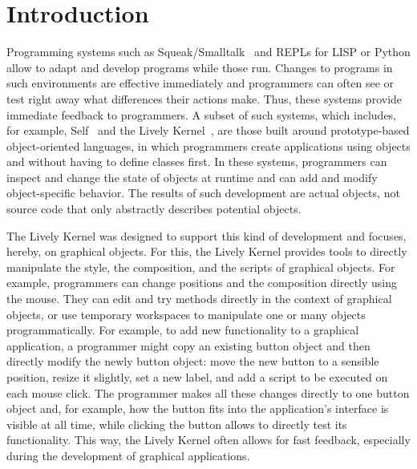 
\chapter{Introduction} \label{chapter:INTRODUCTION}

Programming systems such as Squeak/Smalltalk~\cite{GoldbergRobson83} and REPLs for LISP or Python allow to adapt and develop programs while those run.
Changes to programs in such environments are effective immediately and programmers can often see or test right away what differences their actions make.
Thus, these systems provide immediate feedback to programmers.
A subset of such systems, which includes, for example, Self~\cite{Ungar1987SPS,Ungar2007SEL} and the Lively Kernel~\cite{Ingalls2008LKS,Krahn2009LWD}, are those built around prototype-based object-oriented languages, in which programmers create applications using objects and without having to define classes first.
In these systems, programmers can inspect and change the state of objects at runtime and can add and modify object-specific behavior.
The results of such development are actual objects, not source code that only abstractly describes potential objects.

The Lively Kernel was designed to support this kind of development and focuses, hereby, on graphical objects.
For this, the Lively Kernel provides tools to directly manipulate the style, the composition, and the scripts of graphical objects.
For example, programmers can change positions and the composition directly using the mouse.
They can edit and try methods directly in the context of graphical objects, or use temporary workspaces to manipulate one or many objects programmatically.
For example, to add new functionality to a graphical application, a programmer might copy an existing button object and then directly modify the newly button object: move the new button to a sensible position, resize it slightly, set a new label, and add a script to be executed on each mouse click.
The programmer makes all these changes directly to one button object and, for example, how the button fits into the application's interface is visible at all time, while clicking the button allows to directly test its functionality.
This way, the Lively Kernel often allows for fast feedback, especially during the development of graphical applications.

